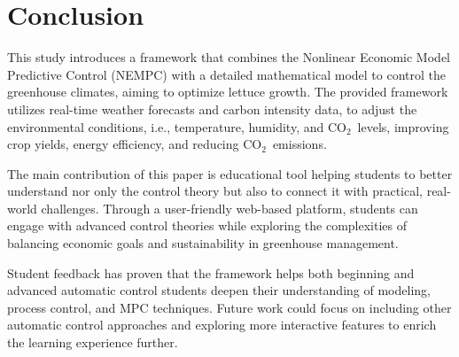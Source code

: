 \documentclass[conference]{IEEEtran}
\newcommand{\coo}{\ensuremath{\mathrm{CO_2}}}
\begin{document}
\section{Conclusion}
This study introduces a framework that combines the Nonlinear Economic Model Predictive Control (NEMPC) with a detailed mathematical model to control the greenhouse climates, aiming to optimize lettuce growth. The provided framework utilizes real-time weather forecasts and carbon intensity data, to adjust the environmental conditions, i.e., temperature, humidity, and \coo\ levels, improving crop yields, energy efficiency, and reducing \coo\ emissions.

The main contribution of this paper is educational tool helping students to better understand nor only the control theory but also to connect it with practical, real-world challenges. Through a user-friendly web-based platform, students can engage with advanced control theories while exploring the complexities of balancing economic goals and sustainability in greenhouse management.

Student feedback has proven that the framework helps both beginning and advanced automatic control students deepen their understanding of modeling, process control, and MPC techniques. Future work could focus on including other automatic control approaches and exploring more interactive features to enrich the learning experience further.



\end{document}
